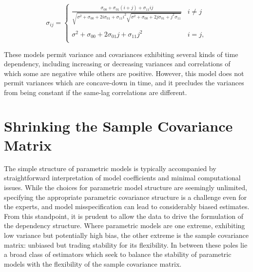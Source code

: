 \begin{equation}
\sigma_{ij} = \left\{ \begin{array}{ll}
\frac{\sigma_{00} + \sigma_{01}\left(i + j\right) + \sigma_{11} ij}{\sqrt{\sigma^2 + \sigma_{00} + 2i\sigma_{01} + \sigma_{11}i^2\sqrt{\sigma^2 + \sigma_{00} + 2j\sigma_{01} +j^2\sigma_{11}} }} &  i \ne j \\ 
& \\
\sigma^2 + \sigma_{00} + 2\sigma_{01}j + \sigma_{11}j^2 &  i= j, \\
\end{array}\right.
\end{equation}


These models permit variance and covariances exhibiting several kinds of time dependency, including increasing or decreasing variances and correlations of which some are negative while others are positive. However, this model does not permit variances which are concave-down in time, and it precludes the variances from being constant if the same-lag correlations are different.
%
%



\section{Shrinking the Sample Covariance Matrix} \label{chapter-1-shrinking-the-sample-cov}

The simple structure of parametric models is typically accompanied by straightforward interpretation of model coefficients and minimal computational issues. While the choices for parametric model structure are seemingly unlimited, specifying the appropriate parametric covariance structure is a challenge even for the experts, and model misspecification can lead to considerably biased estimates. From this standpoint, it is prudent to allow the data to drive the formulation of the dependency structure. Where parametric models are one extreme, exhibiting low variance but potentially high bias, the other extreme is the sample covariance matrix: unbiased but trading stability for its flexibility. In between these poles lie a broad class of estimators which seek to balance the stability of parametric models with the flexibility of the sample covariance matrix.

